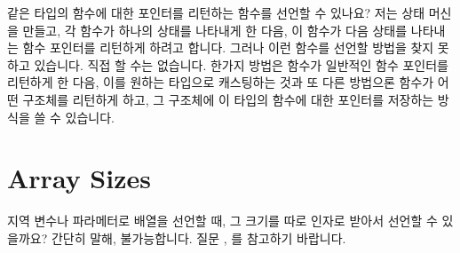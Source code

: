 \begin{faq}
	같은 타입의 함수에 대한 포인터를 리턴하는 함수를 선언할 수
	있나요? 저는 상태 머신을 만들고, 각 함수가
	하나의 상태를 나타내게 한 다음, 이 함수가 다음 상태를 나타내는
	함수 포인터를 리턴하게 하려고 합니다.  그러나 이런 함수를 선언할
	방법을 찾지 못하고 있습니다.
\A	직접 할 수는 없습니다.  한가지 방법은 함수가 일반적인
	함수 포인터를 리턴하게 한 다음, 이를 원하는 타입으로 캐스팅하는 것과 
	또 다른 방법으론 함수가 어떤 구조체를 리턴하게 하고, 그 구조체에
	이 타입의 함수에 대한 포인터를 저장하는 방식을 쓸 수 있습니다.
\end{faq}

\section{Array Sizes}	\label{sec:arraysize}
\begin{faq}
        지역 변수나 파라메터로 배열을 선언할 때, 그 크기를 따로 인자로 받아서
        선언할 수 있을까요?
\A
        간단히 말해, 불가능합니다. 질문 , 를 참고하기
        바랍니다.
\end{faq}

